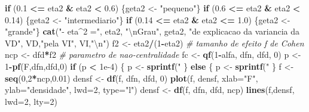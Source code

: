 \documentclass[]{article}
\newenvironment{Shaded}{\begin{snugshade}}{\end{snugshade}}
\newcommand{\KeywordTok}[1]{\textcolor[rgb]{0.13,0.29,0.53}{\textbf{#1}}}
\newcommand{\DataTypeTok}[1]{\textcolor[rgb]{0.13,0.29,0.53}{#1}}
\newcommand{\DecValTok}[1]{\textcolor[rgb]{0.00,0.00,0.81}{#1}}
\newcommand{\FloatTok}[1]{\textcolor[rgb]{0.00,0.00,0.81}{#1}}
\newcommand{\CharTok}[1]{\textcolor[rgb]{0.31,0.60,0.02}{#1}}
\newcommand{\StringTok}[1]{\textcolor[rgb]{0.31,0.60,0.02}{#1}}
\newcommand{\CommentTok}[1]{\textcolor[rgb]{0.56,0.35,0.01}{\textit{#1}}}
\newcommand{\ControlFlowTok}[1]{\textcolor[rgb]{0.13,0.29,0.53}{\textbf{#1}}}
\newcommand{\OperatorTok}[1]{\textcolor[rgb]{0.81,0.36,0.00}{\textbf{#1}}}
\newcommand{\NormalTok}[1]{#1}
\begin{document}
\begin{Shaded}
\begin{Highlighting}[]
{\ControlFlowTok{if}\NormalTok{ (}\FloatTok{0.1} \OperatorTok{<=}\StringTok{ }\NormalTok{eta2 }\OperatorTok{&}\StringTok{ }\NormalTok{eta2 }\OperatorTok{<}\StringTok{ }\FloatTok{0.6}\NormalTok{) \{geta2 <-}\StringTok{ "pequeno"}\NormalTok{\}}
\ControlFlowTok{if}\NormalTok{ (}\FloatTok{0.6} \OperatorTok{<=}\StringTok{ }\NormalTok{eta2 }\OperatorTok{&}\StringTok{ }\NormalTok{eta2 }\OperatorTok{<}\StringTok{ }\FloatTok{0.14}\NormalTok{) \{geta2 <-}\StringTok{ "intermediario"}\NormalTok{\}}
\ControlFlowTok{if}\NormalTok{ (}\FloatTok{0.14} \OperatorTok{<=}\StringTok{ }\NormalTok{eta2 }\OperatorTok{&}\StringTok{ }\NormalTok{eta2 }\OperatorTok{<=}\StringTok{ }\FloatTok{1.0}\NormalTok{) \{geta2 <-}\StringTok{ "grande"}\NormalTok{\}}
\KeywordTok{cat}\NormalTok{(}\StringTok{"- eta^2 ="}\NormalTok{, eta2, }\StringTok{"}\CharTok{\textbackslash{}n}\StringTok{Grau"}\NormalTok{, geta2,}
    \StringTok{"de explicacao da variancia da VD"}\NormalTok{, VD,}\StringTok{"pela VI"}\NormalTok{, VI,}\StringTok{"}\CharTok{\textbackslash{}n}\StringTok{"}\NormalTok{)}
\NormalTok{f2 <-}\StringTok{ }\NormalTok{eta2}\OperatorTok{/}\NormalTok{(}\DecValTok{1}\OperatorTok{-}\NormalTok{eta2) }\CommentTok{# tamanho de efeito f de Cohen}
\NormalTok{ncp <-}\StringTok{ }\NormalTok{dfd}\OperatorTok{*}\NormalTok{f2 }\CommentTok{# parametro de nao-centralidade}
\NormalTok{fc <-}\StringTok{ }\KeywordTok{qf}\NormalTok{(}\DecValTok{1}\OperatorTok{-}\NormalTok{alfa, dfn, dfd, }\DecValTok{0}\NormalTok{)}
\NormalTok{p <-}\StringTok{ }\DecValTok{1}\OperatorTok{-}\KeywordTok{pf}\NormalTok{(F,dfn,dfd,}\DecValTok{0}\NormalTok{)}
\ControlFlowTok{if}\NormalTok{ (p }\OperatorTok{<}\StringTok{ }\FloatTok{1e-4}\NormalTok{)}
\NormalTok{\{}
\NormalTok{  p <-}\StringTok{ }\KeywordTok{sprintf}\NormalTok{(}\StringTok{"%.2e"}\NormalTok{,p)}
\NormalTok{\} }\ControlFlowTok{else}
\NormalTok{\{}
\NormalTok{  p <-}\StringTok{ }\KeywordTok{sprintf}\NormalTok{(}\StringTok{"%.4f"}\NormalTok{,p)}
\NormalTok{\}}
\NormalTok{f <-}\StringTok{ }\KeywordTok{seq}\NormalTok{(}\DecValTok{0}\NormalTok{,}\DecValTok{2}\OperatorTok{*}\NormalTok{ncp,}\FloatTok{0.01}\NormalTok{)}
\NormalTok{densf <-}\StringTok{ }\KeywordTok{df}\NormalTok{(f, dfn, dfd, }\DecValTok{0}\NormalTok{)}
\KeywordTok{plot}\NormalTok{(f, densf, }\DataTypeTok{xlab=}\StringTok{"F"}\NormalTok{, }\DataTypeTok{ylab=}\StringTok{"densidade"}\NormalTok{, }\DataTypeTok{lwd=}\DecValTok{2}\NormalTok{, }\DataTypeTok{type=}\StringTok{"l"}\NormalTok{)}
\NormalTok{densf <-}\StringTok{ }\KeywordTok{df}\NormalTok{(f, dfn, dfd, ncp)}
\KeywordTok{lines}\NormalTok{(f,densf, }\DataTypeTok{lwd=}\DecValTok{2}\NormalTok{, }\DataTypeTok{lty=}\DecValTok{2}\NormalTok{)}
}}}
\end{Highlighting}
\end{Shaded}
\end{document}
